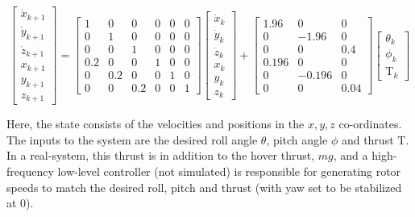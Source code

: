 {\tiny
\begin{equation}
\label{eq:quad_dyn}
\begin{bmatrix} \dot{x}_{k+1} \\ \dot{y}_{k+1} \\ \dot{z}_{k+1} \\ x_{k+1} \\ y_{k+1} \\ z_{k+1} \end{bmatrix}= \begin{bmatrix} 1&0&0&0&0&0 \\0&1&0&0&0&0 \\0&0&1&0&0&0 \\0.2&0&0&1&0&0 \\0&0.2&0&0&1&0 \\0&0&0.2&0&0&1\end{bmatrix} \begin{bmatrix} \dot{x}_{k} \\ \dot{y}_{k} \\ \dot{z}_{k} \\ x_{k} \\ y_{k} \\ z_{k} \end{bmatrix} + \begin{bmatrix} 1.96&0&0 \\ 0&-1.96&0 \\0&0&0.4 \\0.196&0&0 \\0&-0.196&0\\0&0&0.04 \end{bmatrix} \begin{bmatrix} \theta_k \\ \phi_k \\ \text{T}_k \end{bmatrix}
\end{equation}
}

Here, the state consists of the velocities and positions in the $x,y,z$ co-ordinates. The inputs to the system are the desired roll angle $\theta$, pitch angle $\phi$ and thrust $\text{T}$. In a real-system, this thrust is in addition to the hover thrust, $mg$, and a high-frequency low-level controller (not simulated) is responsible for generating rotor speeds to match the desired roll, pitch and thrust (with yaw set to be stabilized at $0$). 

